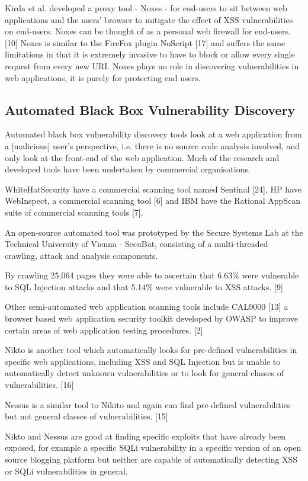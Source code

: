 \documentclass[12pt,a4paper]{article}
\begin{document}
Kirda et al. developed a proxy tool - Noxes - for end-users to sit between  web applications and the users’ browser to mitigate the effect of XSS vulnerabilities on end-users.  Noxes can be thought of as a personal web firewall for end-users. [10] Noxes is similar to the FireFox plugin NoScript [17] and suffers the same limitations in that it is extremely invasive to have to block or allow every single request from every new URI.  Noxes plays no role in discovering vulnerabilities in web applications, it is purely for protecting end users.

\subsection{Automated Black Box Vulnerability Discovery}
Automated black box vulnerability discovery tools look at a web application from a [malicious] user’s perspective, i.e. there is no source code analysis involved, and only look at the front-end of the web application.  Much of the research and developed tools have been undertaken by commercial organisations.

WhiteHatSecurity have a commercial scanning tool named Sentinal [24], HP have WebInspect, a commercial scanning tool [6] and IBM have the Rational AppScan suite of commercial scanning tools [7]. 

An open-source automated tool was prototyped by the Secure Systems Lab at the Technical University of Vienna - SecuBat, consisting of a multi-threaded crawling, attack and analysis components.   

By crawling 25,064 pages they were able to ascertain that 6.63\% were vulnerable to SQL Injection attacks and that 5.14\% were vulnerable to XSS attacks. [9]

Other semi-automated web application scanning tools include CAL9000 [13] a browser based web application security toolkit developed by OWASP to improve certain areas of web application testing procedures. [2]

Nikto is another tool which automatically looks for pre-defined vulnerabilities in specific web applications, including XSS and SQL Injection but is unable to automatically detect unknown vulnerabilities or to look for general classes of vulnerabilities. [16] 

Nessus is a similar tool to Nikito and again can find pre-defined vulnerabilities but not general classes of vulnerabilities. [15]

Nikto and Nessus are good at finding specific exploits that have already been exposed, for example a specific SQLi vulnerability in a specific version of an open source blogging platform but neither are capable of automatically detecting XSS or SQLi vulnerabilities in general.
\end{document}
